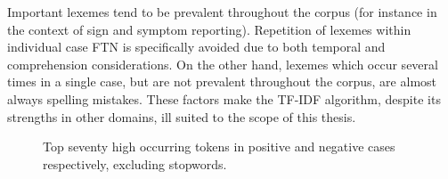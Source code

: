 Important lexemes tend to be prevalent throughout the corpus (for instance in the context of sign and symptom reporting). Repetition of lexemes within individual case FTN is specifically avoided due to both temporal and comprehension considerations. On the other hand, lexemes which occur several times in a single case, but are not prevalent throughout the corpus, are almost always spelling mistakes. These factors make the TF-IDF algorithm, despite its strengths in other domains, ill suited to the scope of this thesis.




    \begin{figure}[!ht]
      \centering
      \caption{Top seventy high occurring tokens in positive and negative cases respectively, excluding stopwords.}
      \label{word-frequency-nonpreprocessed}
   \end{figure}

%










